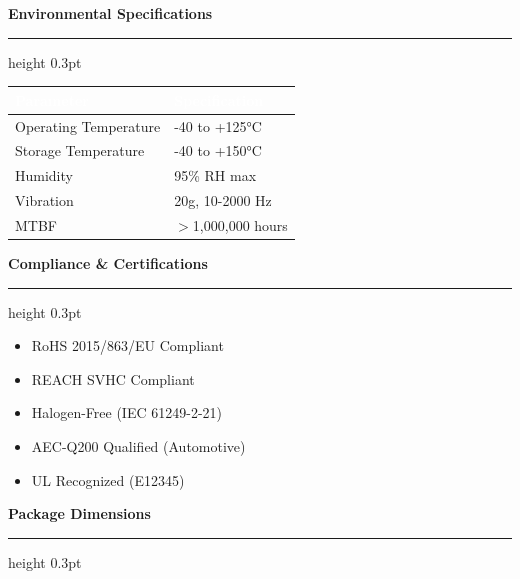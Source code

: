 \documentclass[10pt,a4paper]{article}
\newcommand{\sectiontitle}[1]{%
    \vspace{3mm}%
    {\large\bfseries\color{primary}#1}%
    \vspace{1mm}%
    \hrule height 0.3pt%
    \vspace{2mm}%
}
\begin{document}
\begin{minipage}[t]{0.48\textwidth}
\sectiontitle{Environmental Specifications}
{\footnotesize
\begin{tabular}{|L{35mm}|L{25mm}|}
\hline
{}
\textcolor{white}{\textbf{Parameter}} & \textcolor{white}{\textbf{Specification}} \\
\hline
Operating Temperature & -40 to +125°C \\
Storage Temperature & -40 to +150°C \\
Humidity & 95\% RH max \\
Vibration & 20g, 10-2000 Hz \\
MTBF & $>$1,000,000 hours \\
\hline
\end{tabular}
}
\end{minipage}
\hfill
\begin{minipage}[t]{0.48\textwidth}
\sectiontitle{Compliance \& Certifications}
\begin{itemize}[leftmargin=4mm, itemsep=0pt, topsep=0pt]
    \item[\textcolor{success}{\checkmark}] RoHS 2015/863/EU Compliant
    \item[\textcolor{success}{\checkmark}] REACH SVHC Compliant
    \item[\textcolor{success}{\checkmark}] Halogen-Free (IEC 61249-2-21)
    \item[\textcolor{success}{\checkmark}] AEC-Q200 Qualified (Automotive)
    \item[\textcolor{success}{\checkmark}] UL Recognized (E12345)
\end{itemize}
\end{minipage}

\vspace{4mm}

\sectiontitle{Package Dimensions}
\end{document}
